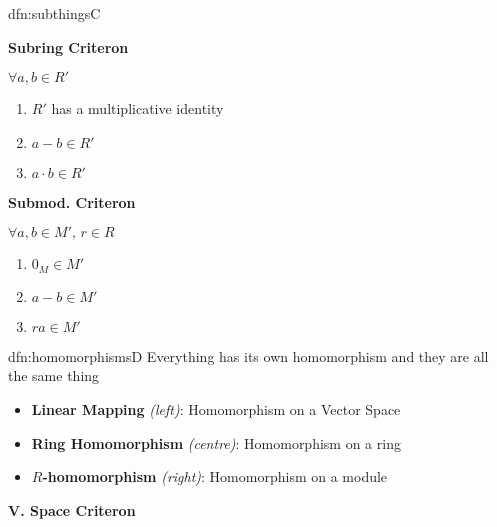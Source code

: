 \documentclass[landscape, 8pt]{extarticle}
\begin{document}
\begin{multicols}{3}
\begin{dfn}{dfn:subthings}{C}
\begin{multicols}{3}
        \textbf{Subring Criteron}

        $\forall a, b\in R'$
        \begin{enumerate}[leftmargin=*]
            \item $R'$ has a multiplicative identity
            \item $a - b \in R'$
            \item $a \cdot b\in R'$
        \end{enumerate}

        \columnbreak

        \textbf{Submod. Criteron}

        $\forall a, b\in M',\,r\in R$
        \begin{enumerate}[leftmargin=*]
            \item $0_{M}\in M'$
            \item $a - b \in M'$
            \item $ra\in M'$
        \end{enumerate}
    \end{multicols}
    \setlength{\columnseprule}{0pt}
\end{dfn}

\vspace{-5pt}
\begin{dfn}{dfn:homomorphisms}{D}
    \vspace{-5pt}
    Everything has its own homomorphism and they are all the same thing
    \vspace{-3pt}
    \begin{itemize}
        \setlength\itemsep{0em}
        \item \textbf{Linear Mapping} \textit{(left)}: Homomorphism on a Vector Space
        \item \textbf{Ring Homomorphism} \textit{(centre)}: Homomorphism on a ring
        \item \textbf{$R$-homomorphism} \textit{(right)}: Homomorphism on a module
    \end{itemize}

    \vspace{-20pt}
    \setlength{\columnseprule}{0.5pt}
    \begin{multicols}{3}
        \textbf{V. Space Criteron}


\end{multicols}
\end{dfn}
\end{multicols}
\end{document}
